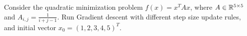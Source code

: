 \documentclass{ExerciseSheet}
\newif\ifsolutions
\begin{document}
\vskip 0.5cm
\begin{exo}
	Consider the quadratic minimization problem $f(x)=x^TAx$, where $A\in \mathbb{R}^{5 \times 5}$ and $A_{i,j}=\frac{1}{i+j-1}$.
 Run Gradient descent with different step size update rules, and initial vector $x_0=(1,2,3,4,5)^T$.
\end{exo}

\ifsolutions
\vskip 0.3cm
\begin{solution}
\end{solution}
\fi
\end{document}
